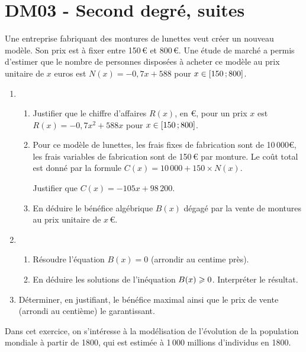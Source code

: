 \documentclass[a4paper,11pt]{article}
\author{Pierquet}
\title{\nomfichier}
\begin{document}
\pagestyle{fancy}

\thispagestyle{entetedm}

\part{DM03 - Second degré, suites}

\medskip

\exonum{}

\smallskip

Une entreprise fabriquant des montures de lunettes veut créer un nouveau modèle. Son prix est à fixer entre 150\,€ et 800\,€. Une étude de marché a permis d’estimer que le nombre de personnes disposées à acheter ce modèle au prix unitaire de $x$ euros est $N(x)=-0,7x+588$ pour $x \in \mbox{\ensuremath{\left[150\mathpunct{};800\right]}}$.
\begin{enumerate}
	\item 
	\begin{enumerate}
		\item Justifier que le chiffre d’affaires $R(x)$, en €, pour un prix $x$ est $R(x)=-0,7x^2+588x$ pour $x \in \mbox{\ensuremath{\left[150\mathpunct{};800\right]}}$.
		\item Pour ce modèle de lunettes, les frais fixes de fabrication sont de 10\,000€, les frais variables de fabrication sont de 150\,€ par monture. Le coût total est donné par la formule $C(x)=10\,000+150 \times N(x)$.
		
		Justifier que $C(x)=-105x+98\,200$.
		\item En déduire le bénéfice algébrique $B(x)$ dégagé par la vente de montures au prix unitaire de $x$\,€.
	\end{enumerate}
	\item 
	\begin{enumerate}
		\item Résoudre l’équation $B(x)=0$ (arrondir au centime près).
		\item En déduire les solutions de l'inéquation $B(x) \geqslant 0$. Interpréter le résultat.
	\end{enumerate}
	\item Déterminer, en justifiant, le bénéfice maximal ainsi que le prix de vente (arrondi au centième) le garantissant.
\end{enumerate}

\medskip

\exonum{}

\smallskip

Dans cet exercice, on s'intéresse à la modélisation de l'évolution de la population mondiale à partir de 1800, qui est estimée à 1\,000 millions d'individus en 1800.
\end{document}

